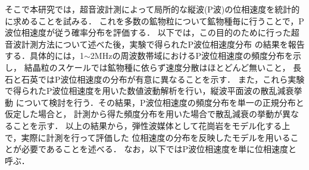 そこで本研究では，超音波計測によって局所的な縦波(P波)の位相速度を統計的に求めることを試みる．
これを多数の鉱物粒について鉱物種毎に行うことで，P波位相速度が従う確率分布を評価する．
以下では，この目的のために行った超音波計測方法について述べた後，実験で得られたP波位相速度分布
の結果を報告する．具体的には，1$\sim$2MHzの周波数帯域におけるP波位相速度の頻度分布を示し，
結晶粒のスケールでは鉱物種に依らず速度分散はほとどんど無いこと，
長石と石英ではP波位相速度の分布が有意に異なることを示す．
また，これら実験で得られたP波位相速度を用いた数値波動解析を行い，縦波平面波の散乱減衰挙動
について検討を行う．その結果，P波位相速度の頻度分布を単一の正規分布と仮定した場合と，
計測から得た頻度分布を用いた場合で散乱減衰の挙動が異なることを示す．
以上の結果から，弾性波媒体として花崗岩をモデル化する上で，実際に計測を行って評価した
位相速度の分布を反映したモデルを用いることが必要であることを述べる．
なお，以下ではP波位相速度を単に位相速度と呼ぶ．


